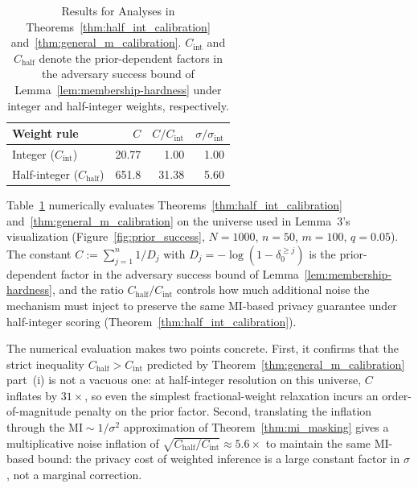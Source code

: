\documentclass[letterpaper]{article} %
\begin{document}
\begin{table}[!htbp]
\centering\small
\caption{Results for Analyses in Theorems~\ref{thm:half_int_calibration} and~\ref{thm:general_m_calibration}. $C_{\mathrm{int}}$ and $C_{\mathrm{half}}$ denote the prior-dependent factors in the adversary success bound of Lemma~\ref{lem:membership-hardness} under integer and half-integer weights, respectively.}
\label{tab:calibration}
\begin{tabular}{lrrr}
\toprule
Weight rule & $C$ & $C / C_{\mathrm{int}}$ & $\sigma / \sigma_{\mathrm{int}}$ \\
\midrule
Integer ($C_{\mathrm{int}}$) & 20.77 & 1.00 & 1.00 \\
Half-integer ($C_{\mathrm{half}}$) & 651.8 & 31.38 & 5.60 \\
\bottomrule
\end{tabular}
\end{table}

Table~\ref{tab:calibration} numerically evaluates Theorems~\ref{thm:half_int_calibration} and~\ref{thm:general_m_calibration} on the universe used in Lemma~3's visualization (Figure~\ref{fig:prior_success}, $N = 1000$, $n = 50$, $m = 100$, $q = 0.05$). The constant $C := \sum_{j=1}^n 1/D_j$ with $D_j = -\log(1 - \delta_0^{\ge j})$ is the prior-dependent factor in the adversary success bound of Lemma~\ref{lem:membership-hardness}, and the ratio $C_{\mathrm{half}}/C_{\mathrm{int}}$ controls how much additional noise the mechanism must inject to preserve the same MI-based privacy guarantee under half-integer scoring (Theorem~\ref{thm:half_int_calibration}).

The numerical evaluation makes two points concrete. First, it confirms that the strict inequality $C_{\mathrm{half}} > C_{\mathrm{int}}$ predicted by Theorem~\ref{thm:general_m_calibration} part~(i) is not a vacuous one: at half-integer resolution on this universe, $C$ inflates by $31\times$, so even the simplest fractional-weight relaxation incurs an order-of-magnitude penalty on the prior factor. Second, translating the inflation through the $\mathrm{MI} \sim 1/\sigma^2$ approximation of Theorem~\ref{thm:mi_masking} gives a multiplicative noise inflation of $\sqrt{C_{\mathrm{half}}/C_{\mathrm{int}}} \approx 5.6\times$ to maintain the same MI-based bound: the privacy cost of weighted inference is a large constant factor in $\sigma$, not a marginal correction.

\end{document}
